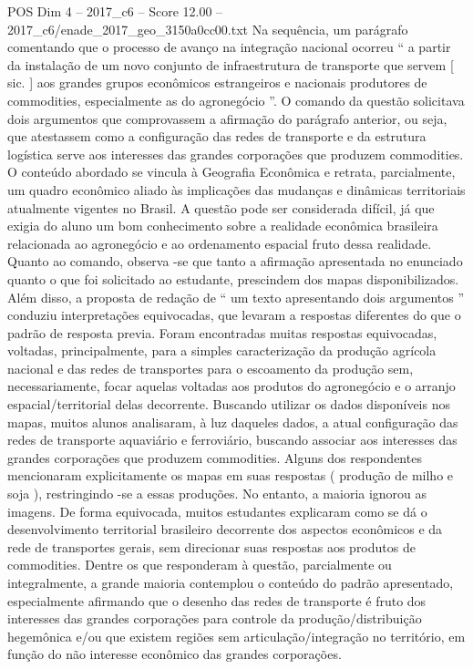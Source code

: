 \begin{textsample}{POS Dim 4 – 2017\_c6 – Score 12.00 – 2017\_c6/enade\_2017\_geo\_3150a0cc00.txt}
Na sequência, um parágrafo comentando que o processo de avanço na integração nacional ocorreu “ a partir da instalação de um novo conjunto de infraestrutura de transporte que servem [ sic. ] aos grandes grupos econômicos estrangeiros e nacionais produtores de commodities, especialmente as do agronegócio ”.
O comando da questão solicitava dois argumentos que comprovassem a afirmação do parágrafo anterior, ou seja, que atestassem como a configuração das redes de transporte e da estrutura logística serve aos interesses das grandes corporações que produzem commodities.
O conteúdo abordado se vincula à Geografia Econômica e retrata, parcialmente, um quadro econômico aliado às implicações das mudanças e dinâmicas territoriais atualmente vigentes no Brasil.
A questão pode ser considerada difícil, já que exigia do aluno um bom conhecimento sobre a realidade econômica brasileira relacionada ao agronegócio e ao ordenamento espacial fruto dessa realidade.
Quanto ao comando, observa -se que tanto a afirmação apresentada no enunciado quanto o que foi solicitado ao estudante, prescindem dos mapas disponibilizados.
Além disso, a proposta de redação de “ um texto apresentando dois argumentos ” conduziu interpretações equivocadas, que levaram a respostas diferentes do que o padrão de resposta previa.
Foram encontradas muitas respostas equivocadas, voltadas, principalmente, para a simples caracterização da produção agrícola nacional e das redes de transportes para o escoamento da produção sem, necessariamente, focar aquelas voltadas aos produtos do agronegócio e o arranjo espacial/territorial delas decorrente.
Buscando utilizar os dados disponíveis nos mapas, muitos alunos analisaram, à luz daqueles dados, a atual configuração das redes de transporte aquaviário e ferroviário, buscando associar aos interesses das grandes corporações que produzem commodities.
Alguns dos respondentes mencionaram explicitamente os mapas em suas respostas ( produção de milho e soja ), restringindo -se a essas produções.
No entanto, a maioria ignorou as imagens.
De forma equivocada, muitos estudantes explicaram como se dá o desenvolvimento territorial brasileiro decorrente dos aspectos econômicos e da rede de transportes gerais, sem direcionar suas respostas aos produtos de commodities.
Dentre os que responderam à questão, parcialmente ou integralmente, a grande maioria contemplou o conteúdo do padrão apresentado, especialmente afirmando que o desenho das redes de transporte é fruto dos interesses das grandes corporações para controle da produção/distribuição hegemônica e/ou que existem regiões sem articulação/integração no território, em função do não interesse econômico das grandes corporações.

\end{textsample}
